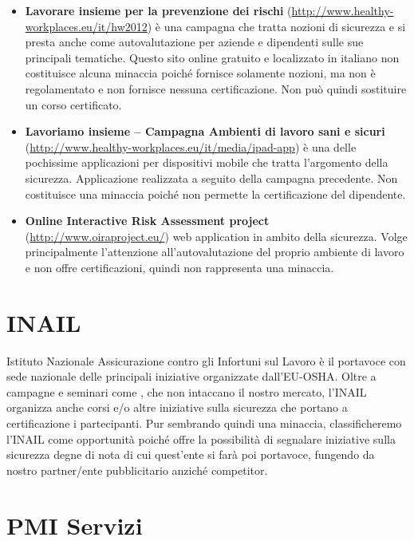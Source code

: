\begin{itemize}
	\item \textbf{Lavorare insieme per la prevenzione dei rischi} (\url{http://www.healthy-workplaces.eu/it/hw2012}) è una campagna che tratta nozioni di sicurezza e si presta anche come autovalutazione per aziende e dipendenti sulle sue principali tematiche. Questo sito online gratuito e localizzato in italiano non costituisce alcuna minaccia poiché fornisce solamente nozioni, ma non è regolamentato e non fornisce nessuna certificazione. Non può quindi sostituire un corso certificato.
	
	\item \textbf{Lavoriamo insieme – Campagna Ambienti di lavoro sani e sicuri} (\url{http://www.healthy-workplaces.eu/it/media/ipad-app}) è una delle pochissime applicazioni per dispositivi mobile che tratta l'argomento della sicurezza. Applicazione realizzata a seguito della campagna precedente. Non costituisce una minaccia poiché non permette la certificazione del dipendente.

	\item \textbf{Online Interactive Risk Assessment project} (\url{http://www.oiraproject.eu/}) web application in ambito della
sicurezza. Volge principalmente l'attenzione all'autovalutazione del proprio ambiente di lavoro e non offre certificazioni, quindi non rappresenta una minaccia.

\end{itemize}

\section*{INAIL}

Istituto Nazionale Assicurazione contro gli Infortuni sul Lavoro è il portavoce con sede nazionale delle principali iniziative organizzate dall'EU-OSHA. Oltre a campagne e seminari come , che non intaccano il nostro mercato, l'INAIL organizza anche corsi e/o altre iniziative sulla sicurezza che portano a certificazione i partecipanti. Pur sembrando quindi una minaccia, classificheremo l'INAIL come opportunità poiché offre la possibilità di segnalare iniziative sulla sicurezza degne di nota di cui quest'ente si farà poi portavoce, fungendo da nostro partner/ente pubblicitario anziché competitor.

\section*{PMI Servizi}

